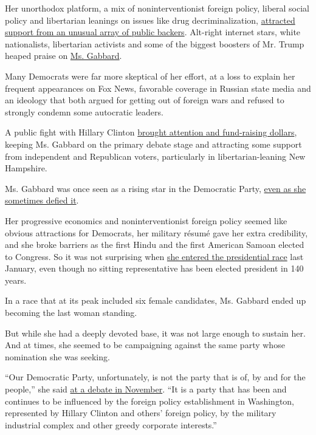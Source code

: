 Her unorthodox platform, a mix of noninterventionist foreign policy,
liberal social policy and libertarian leanings on issues like drug
decriminalization,
\href{https://www.nytimes.com/2019/10/12/us/politics/tulsi-gabbard.html}{attracted
support from an unusual array of public backers}. Alt-right internet
stars, white nationalists, libertarian activists and some of the biggest
boosters of Mr. Trump heaped praise on
\href{https://www.nytimes.com/2019/11/18/us/politics/tulsi-gabbard-clinton-new-hampshire.html}{Ms.
Gabbard}.

Many Democrats were far more skeptical of her effort, at a loss to
explain her frequent appearances on Fox News, favorable coverage in
Russian state media and an ideology that both argued for getting out of
foreign wars and refused to strongly condemn some autocratic leaders.

A public fight with Hillary Clinton
\href{https://www.nytimes.com/2019/11/18/us/politics/tulsi-gabbard-clinton-new-hampshire.html}{brought
attention and fund-raising dollars}, keeping Ms. Gabbard on the primary
debate stage and attracting some support from independent and Republican
voters, particularly in libertarian-leaning New Hampshire.

Ms. Gabbard was once seen as a rising star in the Democratic Party,
\href{https://www.nytimes.com/2015/11/29/us/politics/tulsi-gabbard-rising-democratic-star-from-hawaii-makes-mark-on-party-by-defying-it.html}{even
as she sometimes defied it}.

Her progressive economics and noninterventionist foreign policy seemed
like obvious attractions for Democrats, her military résumé gave her
extra credibility, and she broke barriers as the first Hindu and the
first American Samoan elected to Congress. So it was not surprising when
\href{https://www.nytimes.com/2019/01/11/us/politics/tulsi-gabbard-2020-president-announcement.html}{she
entered the presidential race} last January, even though no sitting
representative has been elected president in 140 years.

In a race that at its peak included six female candidates, Ms. Gabbard
ended up becoming the last woman standing.

But while she had a deeply devoted base, it was not large enough to
sustain her. And at times, she seemed to be campaigning against the same
party whose nomination she was seeking.

``Our Democratic Party, unfortunately, is not the party that is of, by
and for the people,'' she said
\href{https://www.nytimes.com/2019/11/20/us/politics/tulsi-gabbard-harris-debate.html}{at
a debate in November}. ``It is a party that has been and continues to be
influenced by the foreign policy establishment in Washington,
represented by Hillary Clinton and others' foreign policy, by the
military industrial complex and other greedy corporate interests.''

